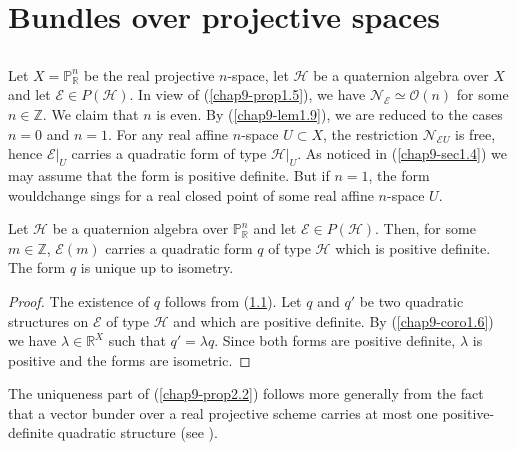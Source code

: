 \section{Bundles over projective spaces}\label{chap9-sec2}

\subsection{}\label{chap9-sec2.1}

Let $X=\mathbb{P}^{n}_{\mathbb{R}}$ be the real projective $n$-space,
let $\mathscr{H}$ be a quaternion algebra over $X$ and let
$\mathscr{E}\in P(\mathscr{H})$. In view of (\ref{chap9-prop1.5}), we
have $\mathscr{N}_{\mathscr{E}}\simeq \mathscr{O}(n)$ for some
$n\in \mathbb{Z}$. We claim that $n$ is even. By (\ref{chap9-lem1.9}),
we are reduced to the cases $n=0$ and $n=1$. For any real affine
$n$-space $U\subset X$, the restriction $\mathscr{N}_{\mathscr{E}U}$
is free, hence $\mathscr{E}|_{U}$ carries a quadratic form of type
$\mathscr{H}|_{U}$. As noticed in (\ref{chap9-sec1.4}) we may assume
that the form is positive definite. But if $n=1$, the form
would\pageoriginale change sings for a real closed point of some real
affine $n$-space $U$.

\setcounter{subprop}{1}
\begin{subprop}\label{chap9-prop2.2}
Let $\mathscr{H}$ be a quaternion algebra over
$\mathbb{P}^{n}_{\mathbb{R}}$ and let $\mathscr{E}\in
P(\mathscr{H})$. Then, for some $m\in \mathbb{Z}$, $\mathscr{E}(m)$
carries a quadratic form $q$ of type $\mathscr{H}$ which is positive
definite. The form $q$ is unique up to isometry.
\end{subprop}

\begin{proof}
The existence of $q$ follows from (\ref{chap9-sec2.1}). Let $q$ and
$q'$ be two quadratic structures on $\mathscr{E}$ of type
$\mathscr{H}$ and which are positive definite. By
(\ref{chap9-coro1.6}) we have $\lambda\in \mathbb{R}^{X}$ such that
$q'=\lambda q$. Since both forms are positive definite, $\lambda$ is
positive and the forms are isometric. 
\end{proof}


\begin{subremark}\label{chap9-rem2.3}
The uniqueness part of (\ref{chap9-prop2.2}) follows more generally
from the fact that a vector bunder over a real projective scheme
carries at most one positive-definite quadratic structure
(see \cite{chap9-key6}). 
\end{subremark}

